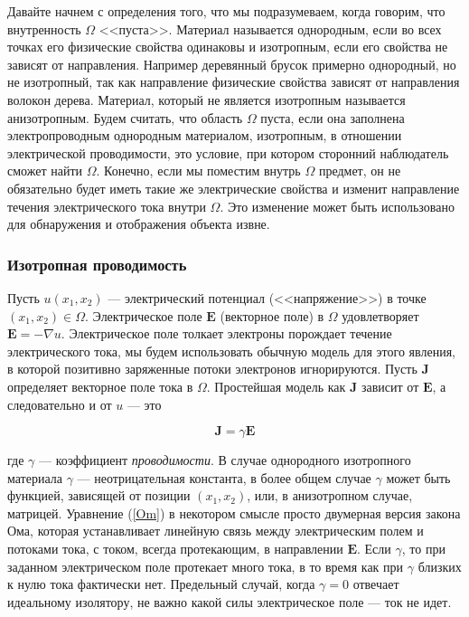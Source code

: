 \documentclass[a4paper, 12pt]{article}
\begin{document}
Давайте начнем с определения того, что мы подразумеваем, когда говорим, что внутренность $\Omega$ <<пуста>>. Материал называется однородным, если во всех точках его физические свойства одинаковы и изотропным, если его свойства не зависят от направления. Например деревянный брусок примерно однородный, но не изотропный, так как направление физические свойства зависят от направления волокон дерева. Материал, который не является изотропным называется анизотропным. Будем считать, что область $\Omega$ пуста, если она заполнена электропроводным однородным материалом, изотропным, в отношении электрической проводимости, это условие, при котором сторонний наблюдатель сможет найти $\Omega$. Конечно, если мы поместим внутрь $\Omega$ предмет, он не обязательно будет иметь такие же электрические свойства и изменит направление течения электрического тока внутри $\Omega$. Это изменение может быть использовано для обнаружения и отображения объекта извне.

\subsubsection{Изотропная проводимость}


Пусть $u(x_1, x_2)$ --- электрический потенциал (<<напряжение>>) в точке $(x_1, x_2) \in \Omega$. Электрическое поле $\textbf{E}$ (векторное поле) в $\Omega$ удовлетворяет $\textbf{E} = - \nabla u$. Электрическое поле толкает электроны порождает течение электрического тока, мы будем использовать обычную модель для этого явления, в которой позитивно заряженные потоки электронов игнорируются. Пусть $\textbf{J}$ определяет векторное поле тока в $\Omega$. Простейшая модель как $\textbf{J}$ зависит от $\textbf{E}$, а следовательно и от  $u$ --- это

\begin{equation}\label{Om}
\textbf{J} = \gamma \textbf{E}
\end{equation}

где $\gamma$ --- коэффициент \textit{проводимости}. В случае однородного изотропного материала $\gamma$ --- неотрицательная константа, в более общем случае $\gamma$ может быть функцией, зависящей от позиции $(x_1, x_2)$, или, в анизотропном случае, матрицей. Уравнение (\ref{Om}) в некотором смысле просто двумерная версия закона Ома, которая устанавливает линейную связь между электрическим полем и потоками тока, с током, всегда протекающим, в направлении  $\textbf{E}$. Если $\gamma$, то при заданном электрическом поле протекает много тока, в то время как при $\gamma$ близких к нулю тока фактически нет. Предельный случай, когда $\gamma = 0$ отвечает идеальному изолятору, не важно какой силы электрическое поле --- ток не идет.
\end{document}
